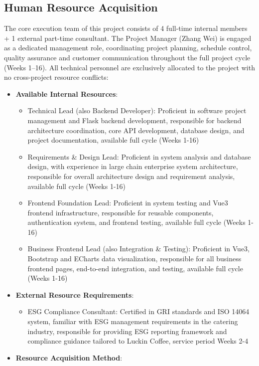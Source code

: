 \documentclass[12pt,a4paper]{article}
\begin{document}
\subsection{Human Resource Acquisition}
The core execution team of this project consists of 4 full-time internal members + 1 external part-time consultant. The Project Manager (Zhang Wei) is engaged as a dedicated management role, coordinating project planning, schedule control, quality assurance and customer communication throughout the full project cycle (Weeks 1--16). All technical personnel are exclusively allocated to the project with no cross-project resource conflicts:
\begin{itemize}
  \item \textbf{Available Internal Resources}:
  \begin{itemize}
    \item Technical Lead (also Backend Developer): Proficient in software project management and Flask backend development, responsible for backend architecture coordination, core API development, database design, and project documentation, available full cycle (Weeks 1-16)
    \item Requirements \& Design Lead: Proficient in system analysis and database design, with experience in large chain enterprise system architecture, responsible for overall architecture design and requirement analysis, available full cycle (Weeks 1-16)
    \item Frontend Foundation Lead: Proficient in system testing and Vue3 frontend infrastructure, responsible for reusable components, authentication system, and frontend testing, available full cycle (Weeks 1-16)
    \item Business Frontend Lead (also Integration \& Testing): Proficient in Vue3, Bootstrap and ECharts data visualization, responsible for all business frontend pages, end-to-end integration, and testing, available full cycle (Weeks 1-16)
  \end{itemize}
  \item \textbf{External Resource Requirements}:
  \begin{itemize}
    \item ESG Compliance Consultant: Certified in GRI standards and ISO 14064 system, familiar with ESG management requirements in the catering industry, responsible for providing ESG reporting framework and compliance guidance tailored to Luckin Coffee, service period Weeks 2-4
  \end{itemize}
  \item \textbf{Resource Acquisition Method}:

\end{itemize}
\end{document}
